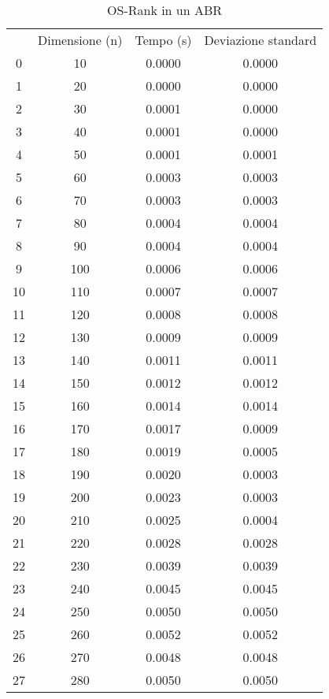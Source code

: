 \begin{table}
\centering
\caption{OS-Rank in un ABR}
\label{OS-Rank in un ABR}
\begin{adjustbox}{width=1\textwidth/2}
\begin{tabular}{|c|c|c|c|}
\hline
 & Dimensione (n) & Tempo (s) & Deviazione standard \\
0 & 10 & 0.0000 & 0.0000 \\
\cline{1-4}
1 & 20 & 0.0000 & 0.0000 \\
\cline{1-4}
2 & 30 & 0.0001 & 0.0000 \\
\cline{1-4}
3 & 40 & 0.0001 & 0.0000 \\
\cline{1-4}
4 & 50 & 0.0001 & 0.0001 \\
\cline{1-4}
5 & 60 & 0.0003 & 0.0003 \\
\cline{1-4}
6 & 70 & 0.0003 & 0.0003 \\
\cline{1-4}
7 & 80 & 0.0004 & 0.0004 \\
\cline{1-4}
8 & 90 & 0.0004 & 0.0004 \\
\cline{1-4}
9 & 100 & 0.0006 & 0.0006 \\
\cline{1-4}
10 & 110 & 0.0007 & 0.0007 \\
\cline{1-4}
11 & 120 & 0.0008 & 0.0008 \\
\cline{1-4}
12 & 130 & 0.0009 & 0.0009 \\
\cline{1-4}
13 & 140 & 0.0011 & 0.0011 \\
\cline{1-4}
14 & 150 & 0.0012 & 0.0012 \\
\cline{1-4}
15 & 160 & 0.0014 & 0.0014 \\
\cline{1-4}
16 & 170 & 0.0017 & 0.0009 \\
\cline{1-4}
17 & 180 & 0.0019 & 0.0005 \\
\cline{1-4}
18 & 190 & 0.0020 & 0.0003 \\
\cline{1-4}
19 & 200 & 0.0023 & 0.0003 \\
\cline{1-4}
20 & 210 & 0.0025 & 0.0004 \\
\cline{1-4}
21 & 220 & 0.0028 & 0.0028 \\
\cline{1-4}
22 & 230 & 0.0039 & 0.0039 \\
\cline{1-4}
23 & 240 & 0.0045 & 0.0045 \\
\cline{1-4}
24 & 250 & 0.0050 & 0.0050 \\
\cline{1-4}
25 & 260 & 0.0052 & 0.0052 \\
\cline{1-4}
26 & 270 & 0.0048 & 0.0048 \\
\cline{1-4}
27 & 280 & 0.0050 & 0.0050 \\

\end{tabular}
\end{adjustbox}
\end{table}
